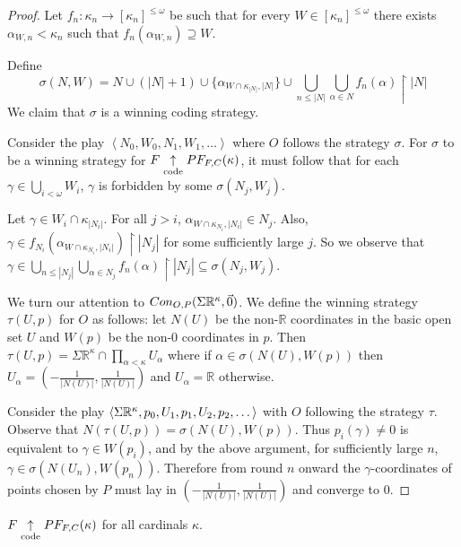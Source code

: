 \begin{proof}
Let $f_n:\kappa_n\to[\kappa_n]^{\leq\omega}$ be such that for every $W\in[\kappa_n]^{\leq\omega}$ there exists $\alpha_{W,n}<\kappa_n$ such that $f_n(\alpha_{W,n})\supseteq W$.

Define \[\sigma(N,W)=N\cup(|N|+1)\cup\{\alpha_{W\cap \kappa_{|N|},|N|}\}\cup\bigcup_{n\leq|N|}\bigcup_{\alpha\in N} f_n(\alpha)\restriction |N|\] We claim that $\sigma$ is a winning coding strategy.

Consider the play $\left<N_0,W_0,N_1,W_1,\dots\right>$ where $O$ follows the strategy $\sigma$. For $\sigma$ to be a winning strategy for $F \underset{\text{code}}{\uparrow} PF_{F,C}(\kappa)$, it must follow that for each $\gamma\in\bigcup_{i<\omega}W_i$, $\gamma$ is forbidden by some $\sigma(N_j,W_j)$. 

Let $\gamma\in W_i\cap \kappa_{|N_i|}$. For all $j>i$, $\alpha_{W\cap\kappa_{N_i},|N_i|}\in N_j$. Also, $\gamma \in f_{N_i}(\alpha_{W\cap\kappa_{N_i},|N_i|})\restriction|N_j|$ for some sufficiently large $j$. So we observe that $\gamma \in \bigcup_{n\leq|N_j|}\bigcup_{\alpha\in N_j} f_n(\alpha)\restriction |N_j|\subseteq \sigma(N_j,W_j)$.

We turn our attention to $Con_{O,P}(\Sigma\mathbb{R}^{\kappa},\vec{0})$. We define the winning strategy $\tau(U,p)$ for $O$ as follows: let $N(U)$ be the non-$\mathbb{R}$ coordinates in the basic open set $U$ and $W(p)$ be the non-$0$ coordinates in $p$. Then $\tau(U,p) =\Sigma\mathbb{R}^\kappa \cap \prod_{\alpha<\kappa} U_\alpha$ where if $\alpha \in \sigma(N(U),W(p))$ then $U_\alpha = (-\frac{1}{|N(U)|},\frac{1}{|N(U)|})$ and $U_\alpha=\mathbb{R}$ otherwise.

Consider the play $\left<\Sigma\mathbb{R}^{\kappa},p_0,U_1,p_1,U_2,p_2,\dots\right>$ with $O$ following the strategy $\tau$. Observe that $N(\tau(U,p))=\sigma(N(U),W(p))$. Thus $p_i(\gamma)\not=0$ is equivalent to $\gamma \in W(p_i)$, and by the above argument, for sufficiently large $n$, $\gamma \in \sigma(N(U_n),W(p_n))$. Therefore from round $n$ onward the $\gamma$-coordinates of points chosen by $P$ must lay in $(-\frac{1}{|N(U)|},\frac{1}{|N(U)|})$ and converge to $0$.
\end{proof}

\begin{thm}
$F\underset{\text{code}}{\uparrow}PF_{F,C}(\kappa)$ for all cardinals $\kappa$.
\end{thm}

